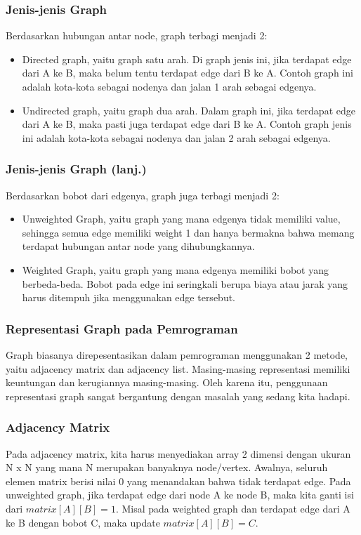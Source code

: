 \begin{frame}
\frametitle{Jenis-jenis Graph}
Berdasarkan hubungan antar node, graph terbagi menjadi 2:
\begin{itemize}
	\item Directed graph, yaitu graph satu arah. Di graph jenis ini, jika terdapat edge dari A ke B, maka belum tentu terdapat edge dari B ke A. Contoh graph ini adalah kota-kota sebagai nodenya dan jalan 1 arah sebagai edgenya.
	\item Undirected graph, yaitu graph dua arah. Dalam graph ini, jika terdapat edge dari A ke B, maka pasti juga terdapat edge dari B ke A. Contoh graph jenis ini adalah kota-kota sebagai nodenya dan jalan 2 arah sebagai edgenya.
\end{itemize}
\end{frame}

\begin{frame}
\frametitle{Jenis-jenis Graph (lanj.)}
Berdasarkan bobot dari edgenya, graph juga terbagi menjadi 2:
\begin{itemize}
	\item Unweighted Graph, yaitu graph yang mana edgenya tidak memiliki value, sehingga semua edge memiliki weight 1 dan hanya bermakna bahwa memang terdapat hubungan antar node yang dihubungkannya.
	\item Weighted Graph, yaitu graph yang mana edgenya memiliki bobot yang berbeda-beda. Bobot pada edge ini seringkali berupa biaya atau jarak yang harus ditempuh jika menggunakan edge tersebut.
\end{itemize}
\end{frame}

\begin{frame}
\frametitle{Representasi Graph pada Pemrograman}

Graph biasanya direpesentasikan dalam pemrograman menggunakan 2 metode, yaitu adjacency matrix dan adjacency list. Masing-masing representasi memiliki keuntungan dan kerugiannya masing-masing. Oleh karena itu, penggunaan representasi graph sangat bergantung dengan masalah yang sedang kita hadapi.
\end{frame}

\begin{frame}
\frametitle{Adjacency Matrix}

Pada adjacency matrix, kita harus menyediakan array 2 dimensi dengan ukuran N x N yang mana N merupakan banyaknya node/vertex. \newline\newline
Awalnya, seluruh elemen matrix berisi nilai 0 yang menandakan bahwa tidak terdapat edge. Pada unweighted graph, jika terdapat edge dari node A ke node B, maka kita ganti isi dari $matrix[A][B] = 1$. Misal pada weighted graph dan terdapat edge dari A ke B dengan bobot C, maka update $matrix[A][B] = C$.
\end{frame}

